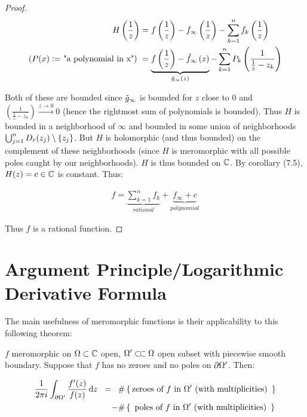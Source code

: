 \begin{proof}
\begin{align*}
H\left( \frac{1}{z} \right) &= f\left( \frac{1}{z} \right) - f_\infty\left( \frac{1}{z} \right) - \sum_{k=1}^n f_k\left( \frac{1}{z} \right)\\
\text{($P(x) \vcentcolon = $ "a polynomial in x") } &=\underbrace{f\left( \frac{1}{z} \right) - \Tilde{f}_\infty\left( z \right)}_{\Tilde{g}_\infty (z)} - \sum_{k=1}^n P_k\left( \frac{1}{\frac{1}{z} - z_k} \right)\\
\end{align*}


Both of these are bounded since $\Tilde{g}_\infty$ is bounded for $z$ close to $0$ and $\left( \frac{1}{\frac{1}{z} - z_k} \right) \xrightarrow[]{z \to 0} 0$ (hence the rightmost sum of polynomials is bounded). Thus $H$ is bounded in a neighborhood of $\infty$ and bounded in some union of neighborhoods $\bigcup_{j=1}^n D_r (z_j) \setminus \{ z_j \}$. But $H$ is holomorphic (and thus bounded) on the complement of these neighborhoods (since $H$ is meromorphic with all possible poles caught by our neighborhoods). $H$ is thus bounded on $\mathbb{C}$. By corollary (7.5), $H(z) = c \in \mathbb{C}$ is constant. Thus:

\begin{align*}
    f = \underbrace{\sum_{k=1}^n f_k}_{rational} + \underbrace{f_\infty +c}_{polynomial}
\end{align*}

Thus $f$ is a rational function.
\end{proof}


\section{Argument Principle/Logarithmic Derivative Formula}

The main usefulness of meromorphic functions is their applicability to this following theorem:


\begin{theorem}

$f$ meromorphic on $\Omega \subset \mathbb{C}$ open, $\om ' \ssubset \om$ open subset with piecewise smooth boundary. Suppose that $f$ has no zeroes and no poles on $\partial \Omega '$. Then:

\begin{align*}
    \frac{1}{2 \pi i} \int_{\partial \om '} \frac{f'(z)}{f(z)} \dif z \;\; = \;\;\; & \# \set{\text{zeroes of $f$ in $\om '$ (with multiplicities)  } }\\
    -  &\# \set{ \text{ poles of $f$ in $\om '$ (with multiplicities) } }
\end{align*}

\end{theorem}


